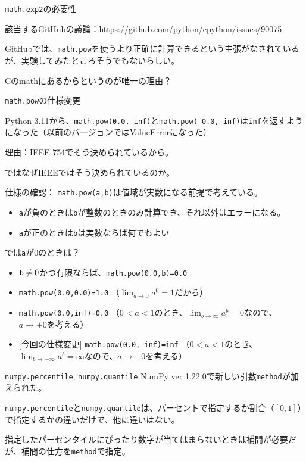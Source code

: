 \documentclass[unicode,lualatex,aspectratio=169]{beamer}
\begin{document}
\begin{frame}[fragile]{{\tt math.exp2}の必要性}
  
  {\tiny 該当するGitHubの議論：\url{https://github.com/python/cpython/issues/90075}}

  GitHubでは、\verb|math.pow|を使うより正確に計算できるという主張がなされているが、実験してみたところそうでもないらしい。

  Cのmathにあるからというのが唯一の理由？
\end{frame}
\begin{frame}[fragile]{{\tt math.pow}の仕様変更}
  
  Python 3.11から、\verb|math.pow(0.0,-inf)|と\verb|math.pow(-0.0,-inf)|は\verb|inf|を返すようになった（以前のバージョンではValueErrorになった）

  理由：IEEE 754でそう決められているから。

  ではなぜIEEEではそう決められているのか。
\end{frame}
\begin{frame}[fragile]
  仕様の確認：
  \verb|math.pow(a,b)|は値域が実数になる前提で考えている。
  \begin{itemize}
  \item \verb|a|が負のときは\verb|b|が整数のときのみ計算でき、それ以外はエラーになる。
  \item \verb|a|が正のときは\verb|b|は実数ならば何でもよい
  \end{itemize}

  では\verb|a|が0のときは？
  \begin{itemize}
  \item ${\tt b}\neq 0$かつ有限ならば、\verb|math.pow(0.0,b)=0.0|
  \item \verb|math.pow(0.0,0.0)=1.0| （$\lim_{a\to 0} a^0=1$だから）
  \item \verb|math.pow(0.0,inf)=0.0|
    （$0<a<1$のとき、$\lim_{b\to \infty} a^b=0$なので、$a\to +0$を考える）
  \item {[今回の仕様変更]} \verb|math.pow(0.0,-inf)=inf|
    （$0<a<1$のとき、$\lim_{b\to -\infty} a^b=\infty$なので、$a\to +0$を考える）
  \end{itemize}
\end{frame}
\begin{frame}[fragile]{{\tt numpy.percentile}, {\tt numpy.quantile}}
  NumPy ver 1.22.0で新しい引数\verb|method|が加えられた。

  {\tt numpy.percentile}と{\tt numpy.quantile}は、パーセントで指定するか割合（$[0,1]$）で指定するかの違いだけで、他に違いはない。

  指定したパーセンタイルにぴったり数字が当てはまらないときは補間が必要だが、補間の仕方を\verb|method|で指定。
\end{frame}
\end{document}
